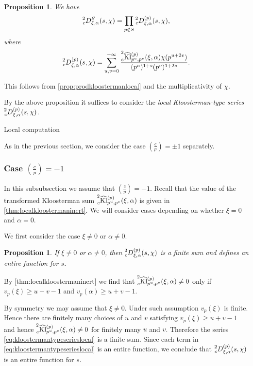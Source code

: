 \documentclass[10pt,oneside,reqno]{amsart}
\makeatletter
\newcommand\Kl{\mathrm{Kl}}
\renewcommand\geq{\geqslant}
\newcommand\legendresymbol[2]{\genfrac{(}{)}{}{}{#1}{#2}}
\def\subsection{\@startsection{subsection}{2}%
  \z@{3pt\@plus0pt}{-.5em}%
  {\normalfont\bfseries}}
\theoremstyle{THEOREM}
\newtheorem{proposition}[theorem]{Proposition}
\theoremstyle{DEFINITION}
\theoremstyle{EXERCISE}
\numberwithin{equation}{section}
\renewenvironment{proof}[1][\proofname]{\par
  \vspace{-6pt}
  \pushQED{\qed}
  \normalfont \topsep6\p@\@plus6\p@\relax
  \trivlist
  \item[\hskip\labelsep\rmfamily\bfseries
    #1\@addpunct{:}]\ignorespaces
}{
  \popQED\endtrivlist\@endpefalse
  \vspace{-6pt}
}
\makeatother
\begin{document}
\begin{proposition}\label{prop:splitkloostermanseries}
We have
\[
\prescript{2}{c}D_{\xi,\alpha}^S(s,\chi)=\prod_{p\notin S}\prescript{2}{c}D_{\xi,\alpha}^{(p)}(s,\chi),
\]
where
\begin{equation}\label{eq:kloostermantypeserieslocal}
\prescript{2}{c}D_{\xi,\alpha}^{(p)}(s,\chi)=\sum_{u,v=0}^{+\infty} \frac{\prescript{2}{c}{\widehat{\Kl}}_{p^u,p^v}^{(p)}(\xi,\alpha)\chi(p^{u+2v})}{(p^u) ^{1+s}(p^v)^{1+2s}}.
\end{equation}
\end{proposition}
\begin{proof}
This follows from \autoref{prop:prodkloostermanlocal} and the multiplicativity of $\chi$. 
\end{proof}
By the above proposition it suffices to consider the \emph{local Kloosterman-type series} $\prescript{2}{c}D_{\xi,\alpha}^{(p)}(s,\chi)$.  

\subsection{Local computation}

As in the previous section, we consider the case $\legendresymbol{c}{p}=\pm 1$ separately. 
\subsubsection{Case $\legendresymbol{c}{p}=-1$}
In this subsubsection we assume that $\legendresymbol{c}{p}=-1$. Recall that the value of the transformed Kloosterman sum $\prescript{2}{c}{\widehat{\Kl}}_{p^u,p^v}^{(p)}(\xi,\alpha)$ is given in \autoref{thm:localkloostermaninert}.  We will consider cases depending on whether $\xi=0$ and $\alpha=0$.

We first consider the case $\xi\neq 0$ or $\alpha\neq 0$.
\begin{proposition}\label{prop:finitesuminert}
If $\xi\neq 0$ or $\alpha\neq 0$, then $\prescript{2}{c}D_{\xi,\alpha}^{(p)}(s,\chi)$ is a finite sum and defines an entire function for $s$.
\end{proposition}

\begin{proof}
By \autoref{thm:localkloostermaninert} we find that $\prescript{2}{c}{\widehat{\Kl}}_{p^u,p^v}^{(p)}(\xi,\alpha)\neq 0$ only if $v_p(\xi)\geq u+v-1$ and $v_p(\alpha)\geq u+v-1$.

By symmetry we may assume that $\xi\neq 0$. Under such assumption $v_p(\xi)$ is finite. Hence there are finitely many choices of $u$ and $v$ satisfying $v_p(\xi)\geq u+v-1$ and hence $\prescript{2}{c}{\widehat{\Kl}}_{p^u,p^v}^{(p)}(\xi,\alpha)\neq 0$ for finitely many $u$ and $v$. Therefore the series \eqref{eq:kloostermantypeserieslocal} is a finite sum. Since each term in \eqref{eq:kloostermantypeserieslocal} is an entire function, we conclude that $\prescript{2}{c}D_{\xi,\alpha}^{(p)}(s,\chi)$ is an entire function for $s$.
\end{proof}
\end{document}
